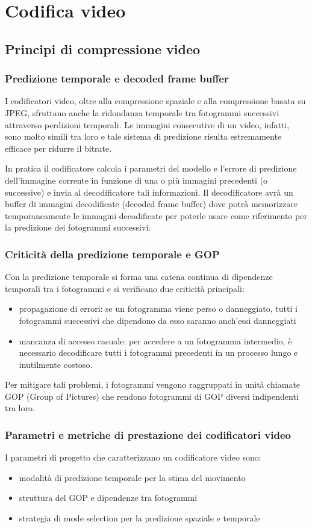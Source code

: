 \section{Codifica video}
\subsection{Principi di compressione video}
\subsubsection*{Predizione temporale e decoded frame buffer}
I codificatori video, oltre alla compressione spaziale e alla compressione basata su JPEG, sfruttano anche la ridondanza
temporale tra fotogrammi successivi attraverso perdizioni temporali. Le immagini consecutive di un video, infatti, sono
molto simili tra loro e tale sistema di predizione risulta estremamente efficace per ridurre il bitrate.

In pratica il codificatore calcola i parametri del modello e l'errore di predizione dell'immagine corrente in funzione di
una o più immagini precedenti (o successive) e invia al decodificatore tali informazioni. Il decodificatore avrà un buffer
di immagini decodificate (decoded frame buffer) dove potrà memorizzare temporaneamente le immagini decodificate per poterle
usare come riferimento per la predizione dei fotogrammi successivi.

\subsubsection*{Criticità della predizione temporale e GOP}
Con la predizione temporale si forma una catena continua di dipendenze temporali tra i fotogrammi e si verificano due
criticità principali:
\begin{itemize}
	\item propagazione di errori: se un fotogramma viene perso o danneggiato, tutti i fotogrammi successivi che dipendono
	da esso saranno anch'essi danneggiati
	\item mancanza di accesso casuale: per accedere a un fotogramma intermedio, è necessario decodificare tutti i fotogrammi
	precedenti in un processo lungo e inutilmente costoso.
\end{itemize}
Per mitigare tali problemi, i fotogrammi vengono raggruppati in unità chiamate GOP (Group of Pictures) che rendono fotogrammi
di GOP diversi indipendenti tra loro.

\subsubsection*{Parametri e metriche di prestazione dei codificatori video}
I parametri di progetto che caratterizzano un codificatore video sono:
\begin{itemize}
	\item modalità di predizione temporale per la stima del movimento
	\item struttura del GOP e dipendenze tra fotogrammi
	\item strategia di mode selection per la predizione spaziale e temporale
\end{itemize}

